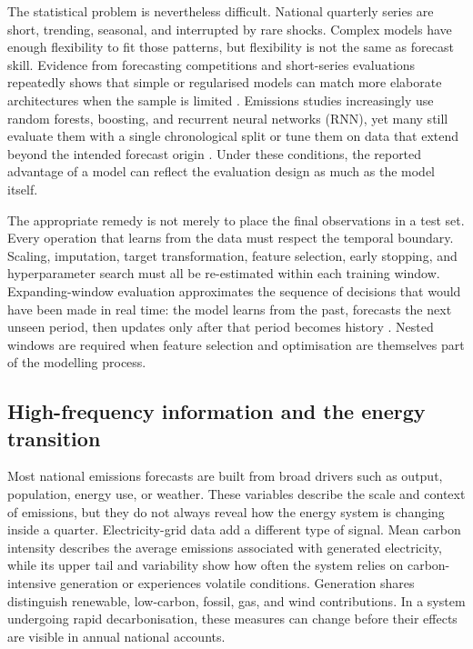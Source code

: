 \documentclass[preprint,12pt]{elsarticle}
\begin{document}
The statistical problem is nevertheless difficult. National quarterly series are short, trending, seasonal, and interrupted by rare shocks. Complex models have enough flexibility to fit those patterns, but flexibility is not the same as forecast skill. Evidence from forecasting competitions and short-series evaluations repeatedly shows that simple or regularised models can match more elaborate architectures when the sample is limited \citep{makridakis2020,hewamalage2023}. Emissions studies increasingly use random forests, boosting, and recurrent neural networks (RNN), yet many still evaluate them with a single chronological split or tune them on data that extend beyond the intended forecast origin \citep{jin2024,kumari2022}. Under these conditions, the reported advantage of a model can reflect the evaluation design as much as the model itself.

The appropriate remedy is not merely to place the final observations in a test set. Every operation that learns from the data must respect the temporal boundary. Scaling, imputation, target transformation, feature selection, early stopping, and hyperparameter search must all be re-estimated within each training window. Expanding-window evaluation approximates the sequence of decisions that would have been made in real time: the model learns from the past, forecasts the next unseen period, then updates only after that period becomes history \citep{cerqueira2020,hyndman2018}. Nested windows are required when feature selection and optimisation are themselves part of the modelling process.

\subsection{High-frequency information and the energy transition}

Most national emissions forecasts are built from broad drivers such as output, population, energy use, or weather. These variables describe the scale and context of emissions, but they do not always reveal how the energy system is changing inside a quarter. Electricity-grid data add a different type of signal. Mean carbon intensity describes the average emissions associated with generated electricity, while its upper tail and variability show how often the system relies on carbon-intensive generation or experiences volatile conditions. Generation shares distinguish renewable, low-carbon, fossil, gas, and wind contributions. In a system undergoing rapid decarbonisation, these measures can change before their effects are visible in annual national accounts.
\end{document}
